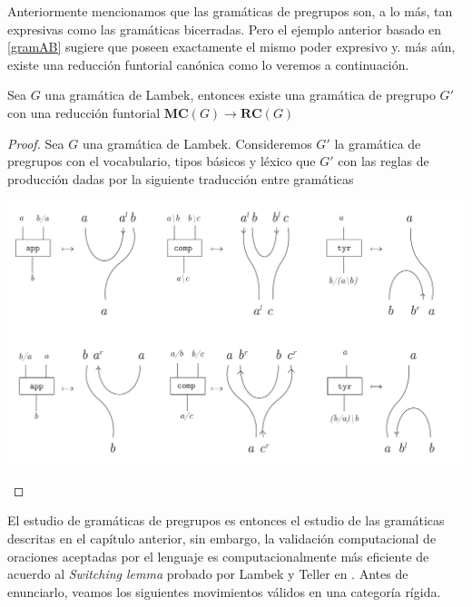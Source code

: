 \documentclass[../main.tex]{subfiles}
\begin{document}
    Anteriormente mencionamos que las gramáticas de pregrupos son, a lo más, tan expresivas como las gramáticas bicerradas. Pero el ejemplo anterior basado en \ref{gramAB} sugiere que poseen exactamente el mismo poder expresivo y. más aún, existe una reducción funtorial canónica como lo veremos a continuación. 
    \begin{prop}
        Sea $G$ una gramática de Lambek, entonces existe una gramática de pregrupo $G'$ con una reducción funtorial $\textbf{MC}(G) \to \textbf{RC}(G)$
    \end{prop}
    \begin{proof}
        Sea $G$ una gramática de Lambek. Consideremos $G'$ la gramática de pregrupos con el vocabulario, tipos básicos y léxico que $G'$ con las reglas de producción dadas por la siguiente traducción entre gramáticas
        \begin{center}
            \includegraphics[scale=.38]{TeX/diagrama/5-5.pdf}
        \end{center}
    \end{proof}

    El estudio de gramáticas de pregrupos es entonces el estudio de las gramáticas descritas en el capítulo anterior, sin embargo, la validación computacional de oraciones aceptadas por el lenguaje es computacionalmente más eficiente de acuerdo al \textit{Switching lemma} probado por Lambek y Teller en \cite{lambek99}. Antes de enunciarlo, veamos los siguientes movimientos válidos en una categoría rígida.
\end{document}

